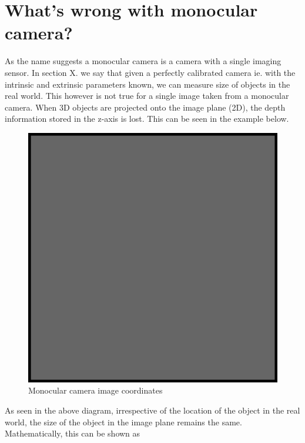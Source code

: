 \section{What's wrong with monocular camera?}
\label{mono_prob}

As the name suggests a monocular camera is a camera with a single imaging sensor. In section X. we say that given a perfectly calibrated camera ie. with the intrinsic and extrinsic parameters known, we can measure size of objects in the real world. This however is not true for a single image taken from a monocular camera. When 3D objects are projected onto the image plane (2D), the depth information stored in the z-axis is lost. This can be seen in the example below. 

\begin{figure}
  \includegraphics{example.eps}
\caption{Monocular camera image coordinates}
\label{fig:3}       %
\end{figure}

As seen in the above diagram, irrespective of the location of the object in the real world, the size of the object in the image plane remains the same. Mathematically, this can be shown as 

